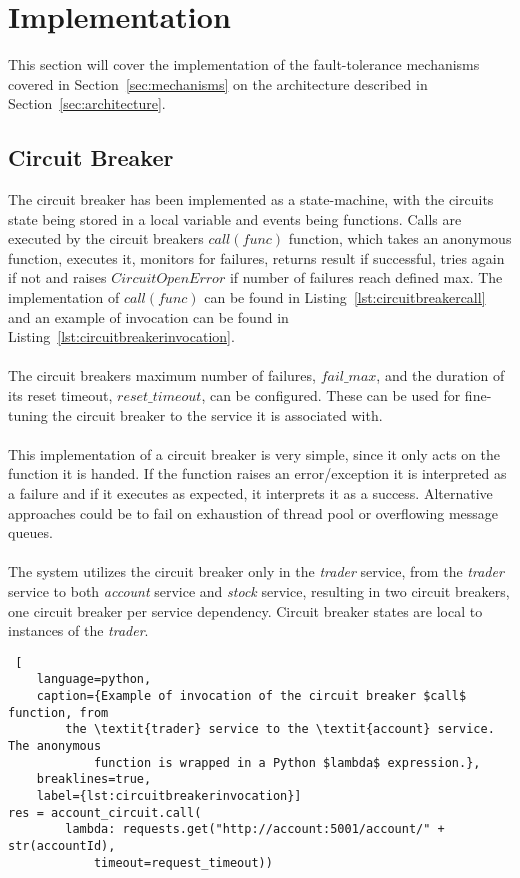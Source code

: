 \section{Implementation}\label{sec:implementation}
This section will cover the implementation of the fault-tolerance mechanisms
covered in Section~\ref{sec:mechanisms} on the architecture described in
Section~\ref{sec:architecture}.

\subsection{Circuit Breaker}
The circuit breaker has been implemented as a state-machine, with the
circuits state being stored in a local variable and events being functions.
Calls are executed by the circuit breakers $call(func)$ function, which takes
an anonymous function, executes it, monitors for failures, returns result if
successful, tries again if not and raises $CircuitOpenError$ if number of
failures reach defined max. The implementation of $call(func)$ can be found in
Listing~\ref{lst:circuitbreakercall} and an example of invocation can be found
in Listing~\ref{lst:circuitbreakerinvocation}.
\\\\
The circuit breakers maximum number of failures, $fail\_max$, and the duration
of its reset timeout, $reset\_timeout$, can be configured. These can be used for
fine-tuning the circuit breaker to the service it is associated with. 
\\\\
This implementation of a circuit breaker is very simple, since it only acts on
the function it is handed. If the function raises an error/exception it is
interpreted as a failure and if it executes as expected, it interprets it as a
success. Alternative approaches could be to fail on exhaustion of thread pool
or overflowing message queues.
\\\\
The system utilizes the circuit breaker only in the \textit{trader} service,
from the \textit{trader} service to both \textit{account} service and 
\textit{stock} service, resulting in two circuit breakers, one circuit breaker
per service dependency. Circuit breaker states are local to instances of the 
\textit{trader}.

\begin{lstlisting} [
	language=python,
	caption={Example of invocation of the circuit breaker $call$ function, from
		the \textit{trader} service to the \textit{account} service. The anonymous
			function is wrapped in a Python $lambda$ expression.},
	breaklines=true,
	label={lst:circuitbreakerinvocation}]
res = account_circuit.call(
		lambda: requests.get("http://account:5001/account/" + str(accountId),
			timeout=request_timeout))
\end{lstlisting}

